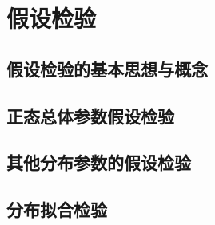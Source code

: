 \chapter{假设检验}

\section{假设检验的基本思想与概念}

\section{正态总体参数假设检验}

\section{其他分布参数的假设检验}

\section{分布拟合检验}

